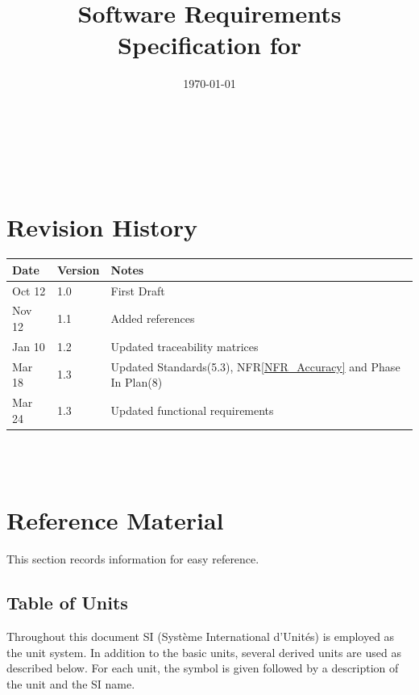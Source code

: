 \documentclass[12pt]{article}
\newcommand{\rref}[1]{R\ref{#1}}
\begin{document}
\title{Software Requirements Specification for \progname} 
\author{\authname}
\date{\today}
	
\maketitle

~\newpage


\tableofcontents

~\newpage

\section*{Revision History}

\begin{tabularx}{\textwidth}{p{3cm}p{2cm}X}
\toprule {\bf Date} & {\bf Version} & {\bf Notes}\\
\midrule
Oct 12 & 1.0 & First Draft\\
Nov 12 & 1.1 & Added references \\
Jan 10 & 1.2 & Updated traceability matrices \\
Mar 18 & 1.3 & Updated Standards(5.3), NF\rref{NFR_Accuracy} and Phase In Plan(8) \\
Mar 24 & 1.3 & Updated functional requirements \\
\bottomrule
\end{tabularx}

~\\

~\newpage

\section{Reference Material}

This section records information for easy reference.

\subsection{Table of Units}

Throughout this document SI (Syst\`{e}me International d'Unit\'{e}s) is employed
as the unit system.  In addition to the basic units, several derived units are
used as described below.  For each unit, the symbol is given followed by a
description of the unit and the SI name.
~\newline
\end{document}

